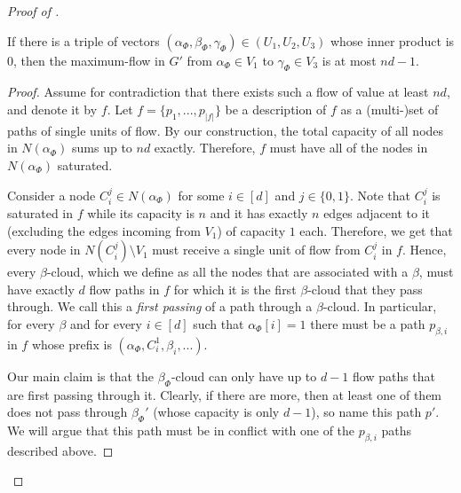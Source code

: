 \documentclass{toc}
\theoremstyle{plain}
\providecommand{\card}[1]{\lvert#1\rvert}
\begin{document}
\begin{proof}[Proof of ]
\begin{claim}
If there is a triple of vectors $(\alpha_{\Phi}, \beta_{\Phi}, \gamma_{\Phi})\in (U_1, U_2, U_3)$ whose inner product is $0$, then the maximum-flow in $G'$ from $\alpha_{\Phi} \in V_1$ to $\gamma_{\Phi} \in V_3$ is at most $nd-1$.
\end{claim}

\begin{proof}
Assume for contradiction that there exists such a flow of value at least $nd$, and denote it by $f$.
Let $f=\{p_1,...,p_{\card{f}}\}$ be a description of $f$ as a (multi-)set of paths of single units of flow.
By our construction, the total capacity of all nodes in $N(\alpha_{\Phi})$ sums up to $nd$ exactly.
Therefore, $f$ must have all of the nodes in $N(\alpha_{\Phi})$ saturated.

Consider a node $C_i^j\in N(\alpha_{\Phi})$ for some $i\in [d]$ and $j\in \{0,1\}$.
Note that $C_i^j$ is saturated in $f$ while its capacity is $n$ and it has exactly $n$ edges adjacent to it (excluding the edges incoming from $V_1$) of capacity $1$ each.
Therefore, we get that every node in $N(C_i^j)\setminus V_1$ must receive a single unit of flow from $C_i^j$ in $f$.
Hence, every $\beta$-cloud, which we define as all the nodes that are associated with a $\beta$, must have exactly $d$ flow paths in $f$ for which it is the first $\beta$-cloud that they pass through. We call this a \textit{first passing} of a path through a $\beta$-cloud.
In particular, for every $\beta$ and for every $i\in [d]$ such that $\alpha_{\Phi}[i]=1$ there must be a path $p_{\beta,i}$ in $f$ whose prefix is $(\alpha_{\Phi}, C_i^1, \beta_i,...)$.

Our main claim is that the $\beta_{\Phi}$-cloud can only have up to $d-1$ flow paths that are first passing through it.
Clearly, if there are more, then at least one of them does not pass through ${\beta_{\Phi}}'$ (whose capacity is only $d-1$), so name this path $p'$.
We will argue that this path must be in conflict with one of the $p_{\beta,i}$ paths described above.


\end{proof}
\end{proof}
\end{document}
